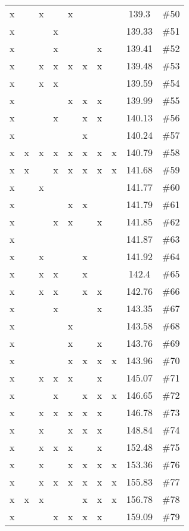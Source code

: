 \begin{table}[H]
{\begin{tabular}{c c c c c c c c c c}
 x &  &  x &  &  x &  &  &  & 139.3 & \#50 \\
 x &  &  &  x &  &  &  &  & 139.33 & \#51 \\
 x &  &  &  x &  &  &  x &  & 139.41 & \#52 \\
 x &  &  x &  x &  x &  x &  x &  & 139.48 & \#53 \\
 x &  &  x &  x &  &  &  &  & 139.59 & \#54 \\
 x &  &  &  &  x &  x &  x &  & 139.99 & \#55 \\
 x &  &  &  x &  &  x &  x &  & 140.13 & \#56 \\
 x &  &  &  &  &  x &  &  & 140.24 & \#57 \\
 x &  x &  x &  x &  x &  x &  x &  x & 140.79 & \#58 \\
 x &  x &  &  x &  x &  x &  x &  x & 141.68 & \#59 \\
 x &  &  x &  &  &  &  &  & 141.77 & \#60 \\
 x &  &  &  &  x &  x &  &  & 141.79 & \#61 \\
 x &  &  &  x &  x &  &  x &  & 141.85 & \#62 \\
 x &  &  &  &  &  &  &  & 141.87 & \#63 \\
 x &  &  x &  &  &  x &  &  & 141.92 & \#64 \\
 x &  &  x &  x &  &  x &  &  & 142.4 & \#65 \\
 x &  &  x &  x &  &  x &  x &  & 142.76 & \#66 \\
 x &  &  &  x &  &  &  x &  & 143.35 & \#67 \\
 x &  &  &  &  x &  &  &  & 143.58 & \#68 \\
 x &  &  &  &  x &  &  x &  & 143.76 & \#69 \\
 x &  &  &  &  x &  x &  x &  x & 143.96 & \#70 \\
 x &  &  x &  x &  x &  &  x &  & 145.07 & \#71 \\
 x &  &  &  x &  &  x &  x &  x & 146.65 & \#72 \\
 x &  &  x &  x &  x &  x &  x &  & 146.78 & \#73 \\
 x &  &  x &  &  x &  x &  x &  & 148.84 & \#74 \\
 x &  &  x &  x &  x &  &  x &  & 152.48 & \#75 \\
 x &  &  x &  &  x &  x &  x &  x & 153.36 & \#76 \\
 x &  &  x &  x &  x &  x &  x &  x & 155.83 & \#77 \\
 x &  x &  x &  &  &  x &  x &  x & 156.78 & \#78 \\
 x &  &  &  x &  x &  x &  x &  & 159.09 & \#79 \\

\end{tabular}}
\end{table}
